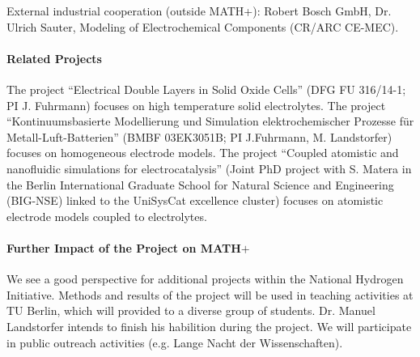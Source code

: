 \documentclass[a4paper,10pt]{article}
\begin{document}
External industrial cooperation (outside MATH+): Robert Bosch GmbH, Dr. Ulrich Sauter, Modeling of Electrochemical Components (CR/ARC CE-MEC).

\paragraph{Related Projects}
The project ``Electrical Double Layers in Solid Oxide Cells'' (DFG FU 316/14-1; PI J. Fuhrmann) focuses
  on high temperature solid electrolytes.
The project  ``Kontinuumsbasierte Modellierung und Simulation elektrochemischer Prozesse für Metall-Luft-Batterien''
  (BMBF  03EK3051B; PI J.Fuhrmann, M. Landstorfer) focuses on homogeneous electrode models.
The project  ``Coupled atomistic and nanofluidic simulations for electrocatalysis'' (Joint PhD project with S. Matera
  in the  Berlin International Graduate School for Natural Science and Engineering (BIG-NSE) linked
  to the UniSysCat excellence cluster) focuses on atomistic electrode models coupled to electrolytes.


\paragraph{Further Impact of the Project on MATH$+$}
We see a good perspective for additional projects within the National Hydrogen Initiative.
%
Methods and results of the project will be used in teaching activities at TU Berlin,
%
which will provided to a diverse group of students.
%
%
Dr. Manuel Landstorfer intends to finish his habilition during the project. %
%
We will participate in public outreach activities (e.g. Lange Nacht der Wissenschaften).
\end{document}
